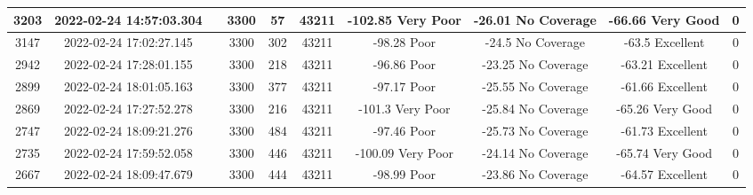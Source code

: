 \begin{longtable*}{|c|c|c|c|c|c|c|c|c|c|}
3203&2022-02-24 14:57:03.304&&3300&57&43211& -102.85   Very Poor   & -26.01    No Coverage & -66.66    Very Good   & 0\\\hline
{}3147&2022-02-24 17:02:27.145&&3300&302&43211& -98.28    Poor        & -24.5     No Coverage & -63.5     Excellent   & 0\\\hline
{}2942&2022-02-24 17:28:01.155&&3300&218&43211& -96.86    Poor        & -23.25    No Coverage & -63.21    Excellent   & 0\\\hline
{}2899&2022-02-24 18:01:05.163&&3300&377&43211& -97.17    Poor        & -25.55    No Coverage & -61.66    Excellent   & 0\\\hline
{}2869&2022-02-24 17:27:52.278&&3300&216&43211& -101.3    Very Poor   & -25.84    No Coverage & -65.26    Very Good   & 0\\\hline
{}2747&2022-02-24 18:09:21.276&&3300&484&43211& -97.46    Poor        & -25.73    No Coverage & -61.73    Excellent   & 0\\\hline
{}2735&2022-02-24 17:59:52.058&&3300&446&43211& -100.09   Very Poor   & -24.14    No Coverage & -65.74    Very Good   & 0\\\hline
{}2667&2022-02-24 18:09:47.679&&3300&444&43211& -98.99    Poor        & -23.86    No Coverage & -64.57    Excellent   & 0\\\hline

\end{longtable*}
